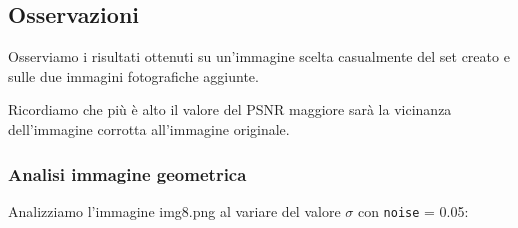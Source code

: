 {\color{bblue}\subsection{Osservazioni}}
Osserviamo i risultati ottenuti su un'immagine scelta casualmente del set creato e sulle due immagini 
 fotografiche aggiunte.

Ricordiamo che più è alto il valore del PSNR maggiore sarà la vicinanza dell'immagine corrotta 
all'immagine originale. 

{\color{bblue}\subsubsection{Analisi immagine geometrica}}
Analizziamo l'immagine img8.png al variare del valore $\sigma$ con \verb|noise| = 0.05:

